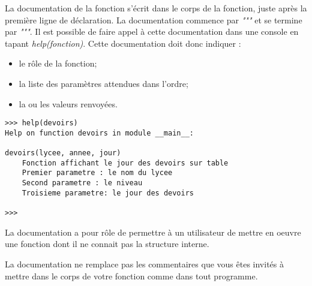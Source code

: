 La documentation de la fonction s'écrit dans le corps de la fonction, juste après la première ligne de déclaration. La documentation commence par \textit{"""} et se termine par \textit{"""}.
Il est possible de faire appel à cette documentation dans une console en tapant \textit{help(fonction)}.
Cette documentation doit donc indiquer :
\begin{itemize}
	\item le rôle de la fonction;
	\item la liste des paramètres attendues dans l'ordre;
	\item la ou les valeurs renvoyées.
\end{itemize}

\begin{lstlisting}[frame=lines]
>>> help(devoirs)
Help on function devoirs in module __main__:

devoirs(lycee, annee, jour)
    Fonction affichant le jour des devoirs sur table
    Premier parametre : le nom du lycee
    Second parametre : le niveau
    Troisieme parametre: le jour des devoirs

>>> 
\end{lstlisting}

La documentation a pour rôle de permettre à un utilisateur de mettre en oeuvre une fonction dont il ne connait pas la structure interne.

La documentation ne remplace pas les commentaires que vous êtes invités à mettre dans le corps de votre fonction comme dans tout programme.  






